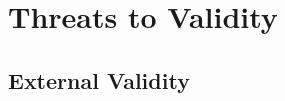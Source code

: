 \documentclass[smallcondesed]{svjour3}
\newcommand{\bi}{\begin{itemize}}%
\newcommand{\ei}{\end{itemize}}
\newcommand{\fig}[1]{Figure~\ref{fig:#1}}
\def\baselinestretch{1}
\begin{document}
 
%
 



 



 


\section{Threats to Validity}

\subsection{External Validity}
\end{document}
